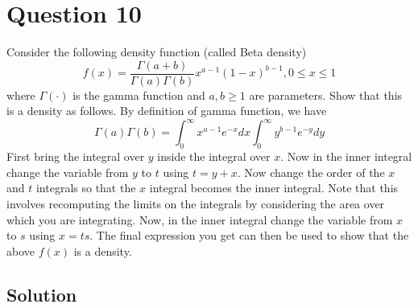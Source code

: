 \section*{Question 10}

Consider the following density function (called Beta density)
\begin{equation*}
    f(x)=\frac{\Gamma(a+b)}{\Gamma(a) \Gamma(b)} x^{a-1}(1-x)^{b-1}, 0 \leq x \leq 1
\end{equation*}
where \( \Gamma(\cdot) \) is the gamma function and \( a, b \geq 1 \) are parameters.
Show that this is a density as follows.
By definition of gamma function, we have
\begin{equation*}
    \Gamma(a) \Gamma(b)=\int_{0}^{\infty} x^{a-1} e^{-x} d x \int_{0}^{\infty} y^{b-1} e^{-y} d y
\end{equation*}
First bring the integral over \( y \) inside the integral over \( x \).
Now in the inner integral change the variable from \( y \) to \( t \) using \( t=y+x \).
Now change the order of the \( x \) and \( t \) integrals so that the \( x \) integral becomes the inner integral.
Note that this involves recomputing the limits on the integrals by considering the area over which you are integrating.
Now, in the inner integral change the variable from \( x \) to \( s \) using \( x=t s \).
The final expression you get can then be used to show that the above \( f(x) \) is a density.

\subsection*{Solution}
